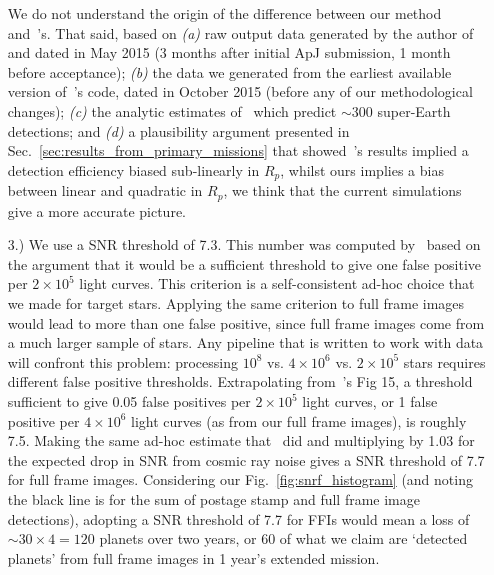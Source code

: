 \begin{itemize}
	We do not understand the origin of the difference between our method and~'s.
	That said, based on 
	\textit{(a)} raw output data generated by the author of~ and dated in May 2015 (3 months after initial ApJ submission, 1 month before acceptance); 
	\textit{(b)} the data we generated from the earliest available version of~'s code, dated in October 2015 (before any of our methodological changes); 
	\textit{(c)} the analytic estimates of~\citet{winn_searchable_2013} which predict $\sim300$ super-Earth detections;
	and \textit{(d)} a plausibility argument presented in Sec.~\ref{sec:results_from_primary_missions} that showed~'s results implied a detection efficiency biased sub-linearly in $R_p$, whilst ours implies a bias between linear and quadratic in $R_p$,
	we think that the current simulations give a more accurate picture.
	
	\item [3.) We use a SNR threshold of 7.3.] This number was computed by~ based on the argument that it would be a sufficient threshold to give one false positive per $2\times10^5$ light curves.
	This criterion is a self-consistent ad-hoc choice that we made for target stars.
	Applying the same criterion to full frame images would lead to more than one false positive, since full frame images come from a much larger sample of stars.
	Any pipeline that is written to work with \tess data will confront this problem:
	processing $10^8$ vs. $4\times10^6$ vs. $2\times10^5$ stars requires different false positive thresholds.
	Extrapolating from~'s Fig 15, a threshold sufficient to give 0.05 false positives per $2\times10^5$ light curves, or 1 false positive per $4\times10^6$ light curves (as from our full frame images), is roughly 7.5.
	Making the same ad-hoc estimate that~ did and multiplying by 1.03 for the expected drop in SNR from cosmic ray noise gives a SNR threshold of 7.7 for full frame images.
	Considering our Fig.~\ref{fig:snrf_histogram} (and noting the black line is for the sum of postage stamp and full frame image detections), adopting a SNR threshold of 7.7 for FFIs would mean a loss of $\sim30\times4=120$ planets over two years, or 60 of what we claim are `detected planets' from full frame images in 1 year's extended mission.	
	

\end{itemize}
